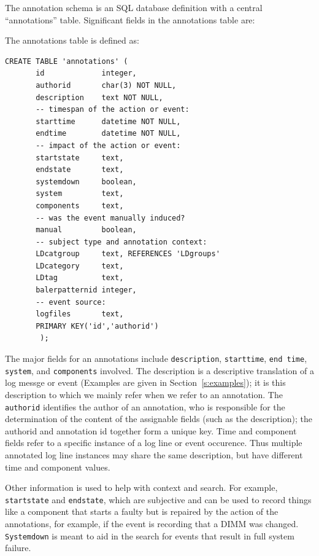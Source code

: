 The annotation schema is an SQL database definition with a central ``annotations'' table. Significant fields in the annotations table are:

The annotations table is defined as:
\begin{small}
\begin{verbatim}
CREATE TABLE 'annotations' (
       id             integer,
       authorid       char(3) NOT NULL,
       description    text NOT NULL,
       -- timespan of the action or event:
       starttime      datetime NOT NULL,
       endtime        datetime NOT NULL,
       -- impact of the action or event:
       startstate     text,
       endstate       text,
       systemdown     boolean,
       system         text,
       components     text,
       -- was the event manually induced?
       manual         boolean,
       -- subject type and annotation context:
       LDcatgroup     text, REFERENCES 'LDgroups'
       LDcategory     text,
       LDtag          text,
       balerpatternid integer,
       -- event source:
       logfiles       text,
       PRIMARY KEY('id','authorid')
        );
\end{verbatim}
\end{small}

The major fields for an annotations include \texttt{description}, \texttt{starttime}, \texttt{end time},
\texttt{system}, and \texttt{components} involved.
The description is a descriptive translation of a log messge or event (Examples
are given in Section~\ref{s:examples}); it is this description to which we
mainly refer when we refer to an annotation.
The \texttt{authorid} identifies the author of an annotation, who
is responsible for the determination of the content of the assignable fields
(such as the description); the authorid and annotation id together form a unique key.
Time and component fields refer to a specific instance of a log line or event
occurence. Thus multiple annotated log line instances may share the same description,
but have different time and component values.

Other information is used to help with context and search.
For example, \texttt{startstate} and \texttt{endstate}, which
are subjective and can be used to record things like a component
that starts a faulty but is repaired by the action of the annotations,
for example, if the event is recording that a DIMM was changed.
\texttt{Systemdown} is meant to aid in the search for events that result
in full system failure.

